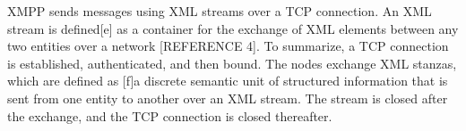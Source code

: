 XMPP sends messages using XML streams over a TCP connection. An XML stream is 
defined[e] as a container for the exchange of XML elements between any two 
entities over a network [REFERENCE 4]. To summarize, a TCP connection is 
established, authenticated, and then bound. The nodes exchange XML stanzas, 
which are defined as [f]a discrete semantic unit of structured information 
that is sent from one entity to another over an XML stream. The stream is 
closed after the exchange, and the TCP connection is closed thereafter.
